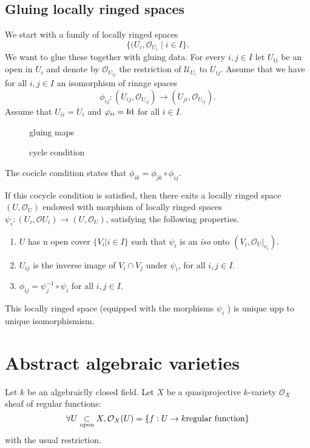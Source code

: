 \subsection{Gluing locally ringed spaces} \label{sec:gluing_locally_ringed_spaces}
We start with a family of locally ringed spaces \[
	\{(U_i, \mathcal{O} _{U_i} \;|\; i \in I\} 
.\] 
We want to glue these together with gluing data. 
For every $  i, j \in I$ let $U_{ij}$ be an open in $U_i$ and denote by $\mathcal{O} _{U_{ij}}$ the restriction of $\mathcal{U} _{U_i}$ to $U_{ij}$. 
Assume that we have for all $i, j \in I$ an isomorphism of rinnge spaces \[
	\phi_{ij}:(U_{ij}, \mathcal{O} _{U_{ij}}) \to (U_{ji}, \mathcal{O} _{U_{ij}})
.\] 
Assume that $U_{ii} = U_i$ and $\varphi_{ii } = \operatorname{Id} $ for all $ i \in I$. 
\begin{figure}[ht]
    \centering
    \caption{gluing maps}
    \label{fig:gluing-maps}
\end{figure}
\begin{figure}[ht]
    \centering
    \caption{cycle condition}
    \label{fig:cycle-condition}
\end{figure}
The cocicle condition states that $\phi_{ik} = \phi_{jk} \circ \phi_{ij}$. 

If this cocycle condition is satisfied, then there exits a locally ringed space $(U, \mathcal{O} _U)$ endowed with morphism of locally ringed spaces $\psi_i : (U_i, \mathcal{O} U_i) \to (U, \mathcal{O} _U)$, satisfying the following properties. 
\begin{enumerate}
	\item $U$ has n open cover $\{V_i | i \in I\} $ such that $\psi _i $ is an \emph{iso} onto $(V_i, \mathcal{O} _U |_{v_i})$.
	\item $U_{ij}$ is the inverse image of $V_i \cap V_j$ under $\psi_i$, for all $i,j \in I$. 
	\item $\phi_{ij} = \psi^{-1}_j \circ \psi_i$ for all $i, j \in I$. 
\end{enumerate}
This locally ringed space (equipped with the morphisms $\psi_i$ ) is unique upp to unique isomorphismism.

\section{Abstract algebraic varieties} \label{sec:abstract_algebraic_varieties}
Let $k$ be an algebraiclly closed field. Let $X$ be a quasiprojective $k$-variety $\mathcal{O} _X$ sheaf of regular functions: \[
	\forall U \underset{\text{open}}{\subset} X, \mathcal{O} _X(U) = \{f: U \to k \text{regular function}\} 
\] 
with the usual restriction.

